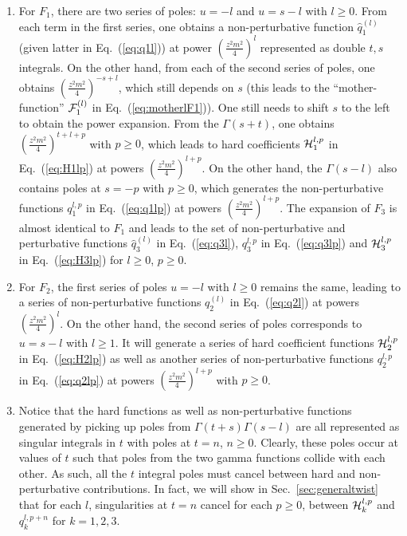 \documentclass[a4paper,11pt]{article}
\begin{document}
\begin{enumerate}
    \item For $F_1$, there are two series of poles: $u=-l$ and $u=s-l$ with $l\ge 0$. From each term in the first series, one obtains a non-perturbative function $\hat q_1^{(l)}$ (given latter in Eq.~(\ref{eq:q1l})) at power $\left(\frac{z^2m^2}{4}\right)^l$ represented as double $t,s$ integrals. On the other hand, from each of the second series of poles, one obtains $\left(\frac{z^2m^2}{4}\right)^{-s+l}$, which still depends on $s$ (this leads to the ``mother-function'' ${\cal F}_1^{(l)}$ in Eq.~(\ref{eq:motherlF1})). One still needs to shift $s$ to the left to obtain the power expansion. From the $\Gamma(s+t)$, one obtains $\left(\frac{z^2m^2}{4}\right)^{t+l+p}$ with $p\ge 0$, which leads to hard coefficients $ {\cal H}_1^{l,p}$ in Eq.~(\ref{eq:H1lp}) at powers $\left(\frac{z^2m^2}{4}\right)^{l+p}$. On the other hand, the $\Gamma(s-l)$ also contains poles at $s=-p$ with $p\ge 0$, which generates the non-perturbative functions $q_1^{l,p}$ in Eq.~(\ref{eq:q1lp}) at powers $\left(\frac{z^2m^2}{4}\right)^{l+p}$.  The expansion of $F_3$ is almost identical to $F_1$ and leads to the set of non-perturbative and perturbative functions $\hat q_3^{(l)}$ in Eq.~(\ref{eq:q3l}), $q_3^{l,p}$ in Eq.~(\ref{eq:q3lp}) and ${\cal H}_3^{l,p}$ in Eq.~(\ref{eq:H3lp}) for $l\ge 0$, $p\ge 0$. 
    \item For $F_2$, the first series of poles  $u=-l$ with $l\ge 0$ remains the same, leading to a series of non-perturbative functions $q_2^{(l)}$ in Eq.~(\ref{eq:q2l}) at powers $\left(\frac{z^2m^2}{4}\right)^l$. On the other hand, the second series of poles corresponds to $u=s-l$ with $l\ge 1$. It will generate a series of hard coefficient functions ${\cal H}_2^{l,p}$ in Eq.~(\ref{eq:H2lp}) as well as another series of non-perturbative functions $q_2^{l,p}$ in Eq.~(\ref{eq:q2lp}) at powers $\left(\frac{z^2m^2}{4}\right)^{l+p}$ with $p\ge 0$.
   \item Notice that the hard functions as well as non-perturbative functions generated by picking up poles from $\Gamma(t+s)\Gamma(s-l)$ are all represented as singular integrals in $t$ with poles at $t=n$, $n\ge 0$. Clearly, these poles occur at values of $t$ such that poles from the two gamma functions collide with each other. As such, all the $t$ integral poles must cancel between hard and non-perturbative contributions. In fact, we will show in Sec.~\ref{sec:generaltwist} that for each $l$, singularities at $t=n$ cancel for each $p\ge 0$, between ${\cal H}_{k}^{l,p}$ and  $q^{l,p+n}_{k}$ for $k=1,2,3$. 

\end{enumerate}
\end{document}
